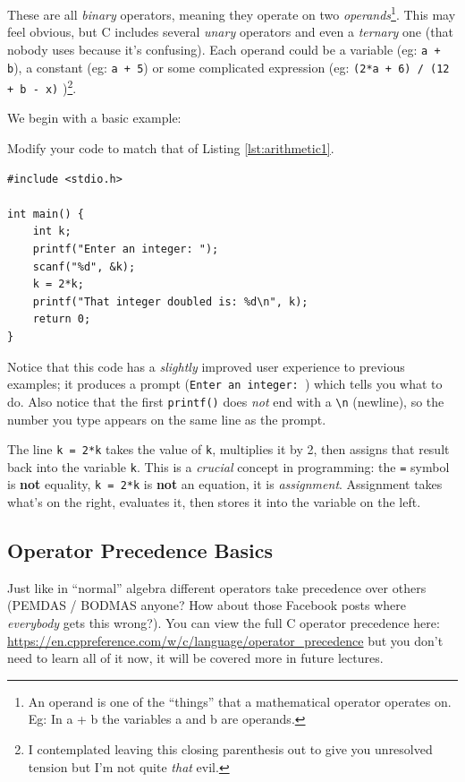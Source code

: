 \documentclass{lab}
\begin{document}
These are all \textit{binary} operators, meaning they operate on two \textit{operands}\footnote{An operand is one of the ``things'' that a mathematical operator operates on. Eg: In a + b the variables a and b are operands.}. This may feel obvious, but C includes several \textit{unary} operators and even a \textit{ternary} one (that nobody uses because it's confusing). Each operand could be a variable (eg: \texttt{a + b}), a constant (eg: \texttt{a + 5}) or some complicated expression (eg: \texttt{(2*a + 6) / (12 + b - x)} )\footnote{I contemplated leaving this closing parenthesis out to give you unresolved tension but I'm not quite \textit{that} evil.}.

We begin with a basic example:

Modify your code to match that of Listing \ref{lst:arithmetic1}.

\begin{lstlisting}[style=CStyle,caption=A basic arithmetic example,label=lst:arithmetic1]
#include <stdio.h>

int main() {
	int k;
	printf("Enter an integer: ");
	scanf("%d", &k);
	k = 2*k;
	printf("That integer doubled is: %d\n", k);
	return 0;
}
\end{lstlisting}

Notice that this code has a \textit{slightly} improved user experience to previous examples; it produces a prompt (\texttt{Enter an integer: }) which tells you what to do. Also notice that the first \texttt{printf()} does \textit{not} end with a \texttt{\textbackslash n} (newline), so the number you type appears on the same line as the prompt.

The line \texttt{k = 2*k} takes the value of \texttt{k}, multiplies it by 2, then assigns that result back into the variable \texttt{k}. This is a \textit{crucial} concept in programming: the \texttt{=} symbol is \textbf{not} equality, \texttt{k = 2*k} is \textbf{not} an equation, it is \textit{assignment}. Assignment takes what's on the right, evaluates it, then stores it into the variable on the left.

\subsection{Operator Precedence Basics}

Just like in ``normal'' algebra different operators take precedence over others (PEMDAS / BODMAS anyone? How about those Facebook posts where \textit{everybody} gets this wrong?). You can view the full C operator precedence here: \url{https://en.cppreference.com/w/c/language/operator_precedence} but you don't need to learn all of it now, it will be covered more in future lectures.
\end{document}
